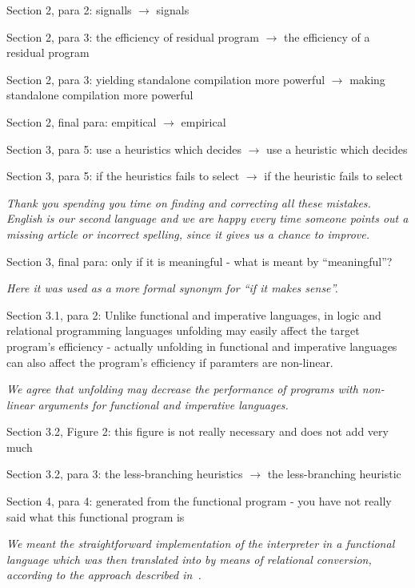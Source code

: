 Section 2, para 2: signalls $\to$ signals

Section 2, para 3: the efficiency of residual program $\to$ the efficiency of a residual program

Section 2, para 3: yielding standalone compilation more powerful $\to$ making standalone compilation more powerful

Section 2, final para: empitical $\to$ empirical

Section 3, para 5: use a heuristics which decides $\to$  use a heuristic which decides

Section 3, para 5: if the heuristics fails to select $\to$ if the heuristic fails to select

\emph{Thank you spending you time on finding and correcting all these mistakes. English is our second language and we are happy every time someone points out a missing article or incorrect spelling, since it gives us a chance to improve.}


Section 3, final para: only if it is meaningful - what is meant by ``meaningful''?

\emph{Here it was used as a more formal synonym for ``if it makes sense''.}

Section 3.1, para 2: Unlike functional and imperative languages, in logic and relational programming languages unfolding
may easily affect the target program’s efficiency - actually unfolding in functional and imperative languages can also
affect the program's efficiency if paramters are non-linear.

\emph{We agree that unfolding may decrease the performance of programs with non-linear arguments for functional and imperative languages. }


Section 3.2, Figure 2: this figure is not really necessary and does not add very much

Section 3.2, para 3: the less-branching heuristics $\to$ the less-branching heuristic

Section 4, para 4: generated from the functional program - you have not really said what this functional program is

\emph{We meant the straightforward implementation of the interpreter in a functional language which was then translated into \mk by means of relational conversion, according to the approach described in~\cite{lozov2019relational}.}

